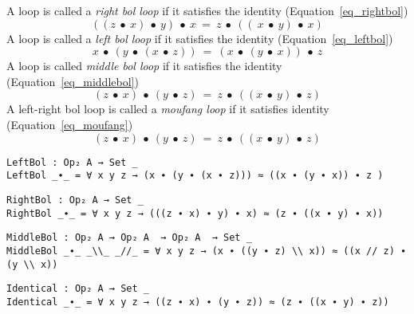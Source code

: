 A loop is called a \textit{right bol loop} if it satisfies the identity
(Equation~\ref{eq_rightbol})
\begin{equation}\label{eq_rightbol}
 ((z\ ∙\ x)\ ∙\ y)\ ∙\ x\ =\ z\ ∙\ ((\ x\ ∙\ y)\ ∙\ x)
\end{equation}
A loop is called a \textit{left bol loop} if it satisfies the identity
(Equation~\ref{eq_leftbol})
\begin{equation}\label{eq_leftbol}
 x\ ∙\ (y\ ∙\ (x\ ∙\ z))\ =\ (x\ ∙\ (y\ ∙\ x))\ ∙\ z
\end{equation}
A loop is called \textit{middle bol loop} if it satisfies the identity
(Equation~\ref{eq_middlebol}) 
\begin{equation}\label{eq_middlebol}
(z\ ∙\ x)\ ∙\ (y\ ∙\ z)\ =\ z\ ∙\ ((x\ ∙\ y)\ ∙\ z)
\end{equation}
A left-right bol loop is called a \textit{moufang loop} if it satisfies identity
(Equation~\ref{eq_moufang})
\begin{equation}\label{eq_moufang}
(z\ ∙\ x)\ ∙\ (y\ ∙\ z)\ =\ z\ ∙\ ((x\ ∙\ y)\ ∙\ z)
\end{equation} 

\begin{verbatim}
LeftBol : Op₂ A → Set _
LeftBol _∙_ = ∀ x y z → (x ∙ (y ∙ (x ∙ z))) ≈ ((x ∙ (y ∙ x)) ∙ z )
\end{verbatim}
\begin{verbatim}
RightBol : Op₂ A → Set _
RightBol _∙_ = ∀ x y z → (((z ∙ x) ∙ y) ∙ x) ≈ (z ∙ ((x ∙ y) ∙ x))
\end{verbatim}
\begin{verbatim}
MiddleBol : Op₂ A → Op₂ A  → Op₂ A  → Set _
MiddleBol _∙_ _\\_ _//_ = ∀ x y z → (x ∙ ((y ∙ z) \\ x)) ≈ ((x // z) ∙ (y \\ x))
\end{verbatim}
\begin{verbatim}
Identical : Op₂ A → Set _
Identical _∙_ = ∀ x y z → ((z ∙ x) ∙ (y ∙ z)) ≈ (z ∙ ((x ∙ y) ∙ z))
\end{verbatim}

